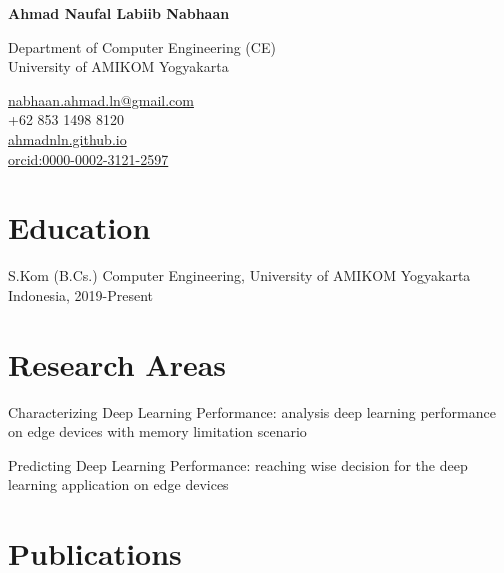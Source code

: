 \documentclass[12pt,letterpaper]{report}
\newcommand{\myname}{Ahmad Naufal Labiib Nabhaan}
\newcommand{\namefont}[1]{{\normalfont\bfseries\Huge{#1}}}
\newcommand{\listitemspace}{0.25em}
\renewenvironment{itemize}
{\begin{list}{}{\setlength{\leftmargin}{0em}
                \setlength{\parskip}{0em}
                \setlength{\itemsep}{\listitemspace}
                \setlength{\parsep}{\listitemspace}}}
{\end{list}}
\begin{document}
    \raggedright{}

    \namefont{\myname}

    \vspace{1em}
    \begin{minipage}[t]{0.700\textwidth}
        Department of Computer Engineering (CE)\\
        University of AMIKOM Yogyakarta
    \end{minipage}
    \begin{minipage}[t]{0.295\textwidth}
        \flushright{}
        \href{mailto:nabhaan.ahmad.ln@gmail.com}{nabhaan.ahmad.ln@gmail.com} \\
        +62 853 1498 8120 \\
        \href{https://ahmadnln.github.io}{ahmadnln.github.io}\\
        \href{https://orcid.org/0000-0002-3121-2597}{orcid:0000-0002-3121-2597}
    \end{minipage}

    \section*{Education}
    
    \begin{tablist}
      \item[S.Kom (B.Cs.)] \tab{}Computer Engineering, University of AMIKOM Yogyakarta \\ Indonesia, 2019-Present
    \end{tablist}
    
    \section*{Research Areas}
    \begin{itemize}
      \item Characterizing Deep Learning Performance: analysis deep learning performance on edge devices with memory limitation scenario
      \item Predicting Deep Learning Performance: reaching wise decision for the deep learning application on edge devices
    \end{itemize}
    
    \section*{Publications}
\end{document}
